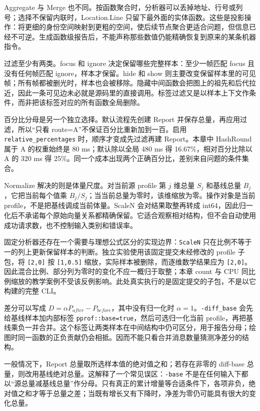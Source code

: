 \documentclass[UTF8,fontset=fandol,openany,11pt]{ctexbook}
\begin{document}
Aggregate 与 Merge 也不同。按函数聚合时，分析器可以丢掉地址、行号或列号；选择不保留内联时，Location.Line 只留下最外面的实体函数。这些是投影操作：将更细的身份空间映射到更粗的空间，使后续节点聚合更适合问题，但信息已经不可逆。生成函数级报告后，不能声称那些数值仍能精确恢复到原来的某条机器指令。\cite{pp-scale}


过滤至少有两类。focus 和 ignore 决定保留哪些完整样本：至少一帧匹配 focus 且没有任何帧匹配 ignore，样本才保留。hide 和 show 则主要改变保留样本里的可见帧；所有帧都被删光时，样本也会被移除。隐藏中间函数会把图上的祖先和后代拉近，因此一条可见边未必就是源码里的直接调用。标签过滤又是以样本上下文作条件，而非把该标签对应的所有函数全局删除。\cite{pp-filter}


百分比分母是另一个独立选择。默认流程先创建 Report 并保存总量，再应用过滤，所以“只看 route=A”不保证百分比重新加到一百。启用 \texttt{relative\_\allowbreak{}percentages} 时，顺序才变成先过滤再建 Report。本章中 HashRound 属于 A 的权重始终是 80 ms；默认除以全局 480 ms 得 16.67\%，相对百分比除以 A 的 320 ms 得 25\%。同一个成本出现两个正确百分比，差别来自问题的条件集合。\cite{pp-denominator}\cite{pp-teaching}


Normalize 解决的则是体量尺度。对当前源 profile 第 \(j\) 维总量 \(S_j\) 和基线总量 \(B_j\)，它把当前每个值乘 \(B_j/S_j\)；当当前总量为零时，该维缩放为零。操作对象是当前 profile，不是把基线调成当前体量。ScaleN 会对结果取整再转成 int64，因此归一化后不承诺每个原始向量关系都精确保留。它适合观察相对结构，但不会自动使用成功请求数，也不控制输入类别和错误率。\cite{pp-merge}\cite{pp-scale}


固定分析器还存在一个需要与理想公式区分的实现边界：\texttt{ScaleN} 只在比例不等于一的列上更新保留样本的判断。独立实验使用该固定提交未经修改的 profile 子包，将 \texttt{[2,\allowbreak{}0]} 按 \texttt{[1,\allowbreak{}0.\allowbreak{}5]} 缩放，实际样本被删除，而逐维数学结果应为 \texttt{[2,\allowbreak{}0]}。因此混合比例、部分列为零时的变化不应一概归于取整；本章 count 与 CPU 同比例缩放的教学案例不受该反例影响。此处真实执行的是固定提交的子包，不是以它构建的完整 CLI。\cite{pp-scale}\cite{pp-scale-repro}


差分可以写成 \(D=\alpha P_{after}-P_{before}\)，其中没有归一化时 \(\alpha=1\)。\texttt{-\allowbreak{}diff\_\allowbreak{}base} 会先给基线样本加内部标签 \texttt{pprof::base=true}，然后可选归一化当前 profile，再把基线乘负一并合并。这个标签让两类样本在中间结构中仍可区分，用于报告分母；绘图时同一函数的正负贡献仍会相抵。因而不能只看合并消息数量猜测净差分的结构。\cite{pp-diff}\cite{pp-merge}


一般情况下，Report 总量取所选样本值的绝对值之和；若存在非零的 diff-base 总量，则改用基线绝对总量。这解释了一个常见误区：\texttt{-\allowbreak{}base} 不是在任何输入下都以“源总量减基线总量”作分母。只有真正的累计增量等合适条件下，各项非负，绝对值之和才等于总量之差；当既有增长又有下降时，净差为零仍可能具有很大的变化总量。\cite{pp-total}
\end{document}
